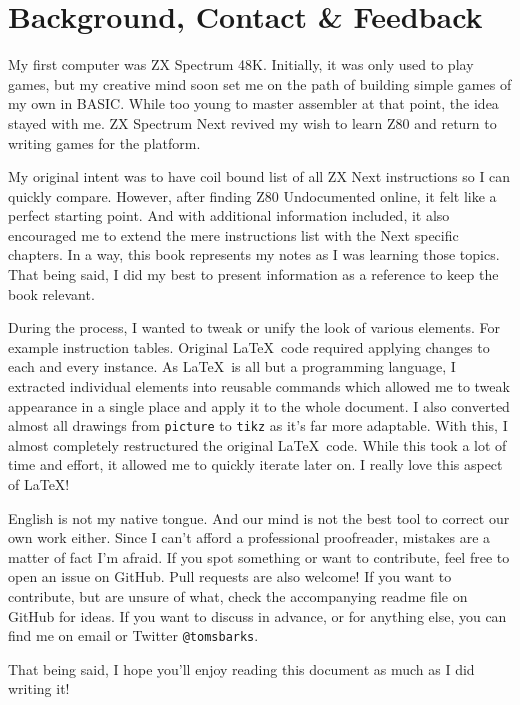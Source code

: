 \pagebreak %
\section{Background, Contact \& Feedback}

My first computer was ZX Spectrum 48K. Initially, it was only used to play games, but my creative mind soon set me on the path of building simple games of my own in BASIC. While too young to master assembler at that point, the idea stayed with me. ZX Spectrum Next revived my wish to learn Z80 and return to writing games for the platform.
    
My original intent was to have coil bound list of all ZX Next instructions so I can quickly compare. However, after finding Z80 Undocumented online, it felt like a perfect starting point. And with additional information included, it also encouraged me to extend the mere instructions list with the Next specific chapters. In a way, this book represents my notes as I was learning those topics. That being said, I did my best to present information as a reference to keep the book relevant.

During the process, I wanted to tweak or unify the look of various elements. For example instruction tables. Original \LaTeX ~code required applying changes to each and every instance. As \LaTeX ~is all but a programming language, I extracted individual elements into reusable commands which allowed me to tweak appearance in a single place and apply it to the whole document. I also converted almost all drawings from {\tt picture} to {\tt tikz} as it's far more adaptable. With this, I almost completely restructured the original \LaTeX ~code. While this took a lot of time and effort, it allowed me to quickly iterate later on. I really love this aspect of \LaTeX!

English is not my native tongue. And our mind is not the best tool to correct our own work either. Since I can't afford a professional proofreader, mistakes are a matter of fact I'm afraid. If you spot something or want to contribute, feel free to open an issue on GitHub. Pull requests are also welcome! If you want to contribute, but are unsure of what, check the accompanying readme file on GitHub for ideas. If you want to discuss in advance, or for anything else, you can find me on email  or Twitter {\tt @tomsbarks}.

That being said, I hope you'll enjoy reading this document as much as I did writing it!

